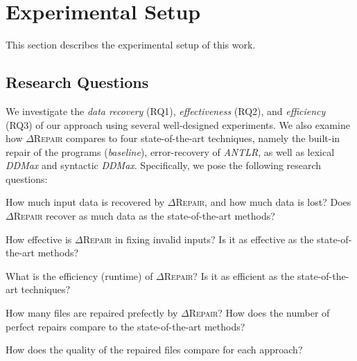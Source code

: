 \documentclass[acmsmall,screen,review,anonymous]{acmart}
\newcommand{\approach}{\textsc{$\Delta$Repair}\xspace}
\newcommand{\ddmax}{\textit{DDMax}\xspace}
\begin{document}

\section{Experimental Setup}
\label{sec:experimental-setup}



This section describes the experimental setup of this work.






\subsection{Research Questions} 
We investigate the \textit{data recovery} (RQ1), \textit{effectiveness} (RQ2), 
and \textit{efficiency} (RQ3) of our approach using several well-designed experiments. %
We also examine how \approach compares to four state-of-the-art techniques, 
namely the built-in repair of the programs (\textit{baseline}), error-recovery of \textit{ANTLR}, as well as 
lexical \ddmax and syntactic 
\ddmax. Specifically, we pose the following research questions:

\begin{description}[labelwidth=!, labelindent=15pt]

\item[RQ1: Data Recovery and Data Loss.]
How much input data is recovered by \approach, and how much data is lost? %
Does \approach recover as much data as 
the state-of-the-art methods?

  \item[RQ2: Effectiveness.]  %
How effective is \approach in fixing invalid inputs? Is it as effective as the state-of-the-art methods?

\item[RQ3: Efficiency.] What is the efficiency (runtime) of
\approach? Is it as efficient as the state-of-the-art techniques?

\item[RQ4: Perfect Repair.] How many files are repaired prefectly by
\approach? How does the number of perfect repairs compare to the state-of-the-art methods?

\item[RQ5: Quality of Repairs.] How does the quality of the repaired files compare for each approach?
\end{description}
\end{document}

